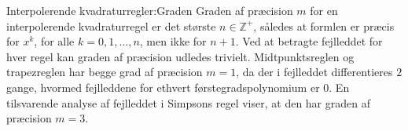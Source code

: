 \begin{frame}{Interpolerende kvadraturregler:Graden}
    Graden af præcision $m$ for en interpolerende kvadraturregel er det største $n \in \mathbb{Z^+}$, således at formlen er præcis for $x^k$, for alle $k = 0, 1, \ldots , n$, men ikke for $n+1$.
    Ved at betragte fejlleddet for hver regel kan graden af præcision udledes trivielt. 
    Midtpunktsreglen og trapezreglen har begge grad af præcision $m=1$, da der i fejlleddet differentieres $2$ gange, hvormed fejlleddene for ethvert førstegradspolynomium er $0$. 
    En tilsvarende analyse af fejlleddet i Simpsons regel viser, at den har graden af præcision $m=3$.
\end{frame}